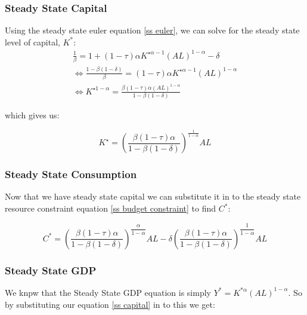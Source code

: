\documentclass[11pt]{article}
\begin{document}
\subsubsection{Steady State Capital}

Using the steady state euler equation \eqref{ss euler}, we can solve for the steady state level of capital, $K^*$:
\begin{equation}
\begin{array}{r}
\frac{1}{\beta}=1+(1-\tau) \alpha K^{\star \alpha-1}(A L)^{1-\alpha}-\delta \\
\Leftrightarrow \frac{1-\beta(1-\delta)}{\beta}=(1-\tau) \alpha K^{\star \alpha-1}(A L)^{1-\alpha} \\
\Leftrightarrow K^{\star 1-\alpha}=\frac{\beta(1-\tau) \alpha(A L)^{1-\alpha}}{1-\beta(1-\delta)}
\end{array}
\end{equation}

which gives us:
\begin{mdframed}
    \begin{equation}
\label{ss capital}
K^{\star}=\left(\frac{\beta(1-\tau) \alpha}{1-\beta(1-\delta)}\right)^{\frac{1}{1-\alpha}} A L
\end{equation}
\end{mdframed}

\subsubsection{Steady State Consumption}

Now that we have steady state capital we can substitute it in to the steady state resource constraint equation \eqref{ss budget constraint} to find $C^*$:

\begin{mdframed}
    \begin{equation}
        \label{ss consumption}
        C^* = \left(\dfrac{\beta(1-\tau)\alpha}{1-\beta(1-\delta)}\right)^{\dfrac{\alpha}{1-\alpha}}AL-\delta\left(\dfrac{\beta(1-\tau)\alpha}{1-\beta(1-\delta)}\right)^{\dfrac{1}{1-\alpha}}AL
    \end{equation}
\end{mdframed}

\subsubsection{Steady State GDP}
We knpw that the Steady State GDP equation is simply $Y^* = K^{*\alpha}(AL)^{1-\alpha}$. So by substituting our equation \eqref{ss capital} in to this we get:
\end{document}
